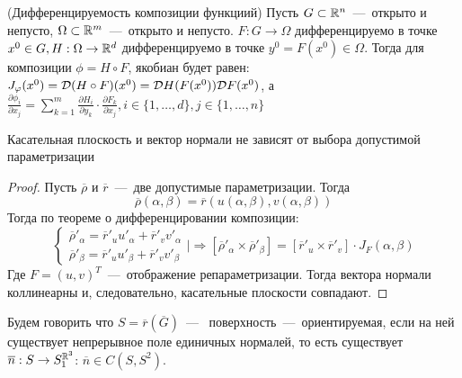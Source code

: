 \begin{reminder}
    (Дифференцируемость композиции функциий)
    Пусть $G \subset \mathbb{R}^n$~---~открыто и непусто, $\Omega \subset \mathbb{R}^m$~---~открыто и непусто. $F: G \rightarrow \Omega$ дифференцируемо в точке $x^0 \in G, H: \Omega \rightarrow \mathbb{R}^d$ дифференцируемо в точке $y^0 = F(x^0) \in \Omega$. Тогда для композиции $\phi = H \circ F$, якобиан будет равен: $J_{\varphi}(x^0) = \mathcal{D}(H \circ F)(x^0) = \mathcal{D} H(F(x^0)) \mathcal{D} F(x^0)$, а $\frac{\partial \phi_i}{\partial x_j} = \sum \limits_{k = 1}^m \frac{\partial H_i}{\partial y_k} \cdot \frac{\partial F_k}{\partial x_j}, i \in \{1, \dots, d\}, j \in \{1, \dots, n\}$
\end{reminder}
\begin{lemma}
    Касательная плоскость и вектор нормали не зависят от выбора допустимой параметризации
\end{lemma}
\begin{proof}
    Пусть $\overline{\rho}$ и $\overline{r}$~---~две допустимые параметризации. Тогда \[\overline{\rho}(\alpha, \beta) = \overline{r}(u(\alpha, \beta), v(\alpha, \beta))\]
    Тогда по теореме о дифференцировании композиции:
    \begin{equation*}
    \begin{cases}
            \overline{\rho}'_\alpha = \overline{r}'_uu'_\alpha + \overline{r}'_vv'_\alpha \\
    \overline{\rho}'_\beta = \overline{r}'_uu'_\beta + \overline{r}'_vv'_\beta
    \end{cases}
    \biggr|\Rightarrow [\overline{\rho}'_\alpha \times \overline{\rho}'_\beta] = [\overline{r}'_u \times \overline{r}'_v] \cdot J_F (\alpha, \beta)
    \end{equation*}
    Где $F = (u, v)^T$~---~отображение репараметризации.
    Тогда вектора нормали коллинеарны и, следовательно, касательные плоскости совпадают.
\end{proof}
\begin{definition}
    Будем говорить что $S = \overline{r}(\overline{G})$~---~ поверхность~---~ориентируемая, если на ней существует непрерывное поле единичных нормалей, то есть существует $\overline{n}: S \rightarrow S^{\mathbb{R}^3}_1$: $\overline{n} \in C(S, S^2)$.
\end{definition}


